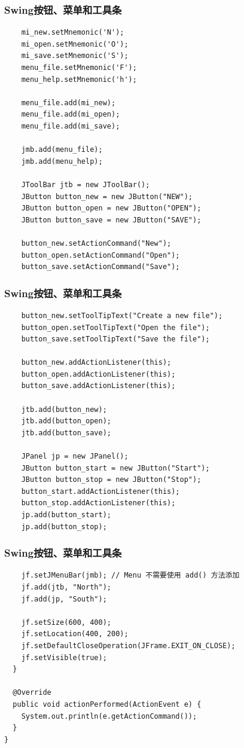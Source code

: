 \begin{frame}[fragile] %
\frametitle{Swing按钮、菜单和工具条}
\scriptsize
\begin{verbatim}    
    mi_new.setMnemonic('N');
    mi_open.setMnemonic('O');
    mi_save.setMnemonic('S');
    menu_file.setMnemonic('F');
    menu_help.setMnemonic('h');
    
    menu_file.add(mi_new);
    menu_file.add(mi_open);
    menu_file.add(mi_save);
    
    jmb.add(menu_file);
    jmb.add(menu_help);

    JToolBar jtb = new JToolBar();
    JButton button_new = new JButton("NEW");
    JButton button_open = new JButton("OPEN");
    JButton button_save = new JButton("SAVE");

    button_new.setActionCommand("New");
    button_open.setActionCommand("Open");
    button_save.setActionCommand("Save");
\end{verbatim}
\end{frame}

\begin{frame}[fragile] %
\frametitle{Swing按钮、菜单和工具条}
\scriptsize
\begin{verbatim}
    button_new.setToolTipText("Create a new file");
    button_open.setToolTipText("Open the file");
    button_save.setToolTipText("Save the file");
    
    button_new.addActionListener(this);
    button_open.addActionListener(this);
    button_save.addActionListener(this);
    
    jtb.add(button_new);
    jtb.add(button_open);
    jtb.add(button_save);
    
    JPanel jp = new JPanel();
    JButton button_start = new JButton("Start");
    JButton button_stop = new JButton("Stop");
    button_start.addActionListener(this);
    button_stop.addActionListener(this);
    jp.add(button_start);
    jp.add(button_stop);
\end{verbatim}
\end{frame}

\begin{frame}[fragile] %
\frametitle{Swing按钮、菜单和工具条}
\scriptsize
\begin{verbatim}		
    jf.setJMenuBar(jmb); // Menu 不需要使用 add() 方法添加
    jf.add(jtb, "North");
    jf.add(jp, "South");
    
    jf.setSize(600, 400);
    jf.setLocation(400, 200);
    jf.setDefaultCloseOperation(JFrame.EXIT_ON_CLOSE);
    jf.setVisible(true);
  }

  @Override
  public void actionPerformed(ActionEvent e) {
    System.out.println(e.getActionCommand());
  }
}  
\end{verbatim}
\end{frame}

